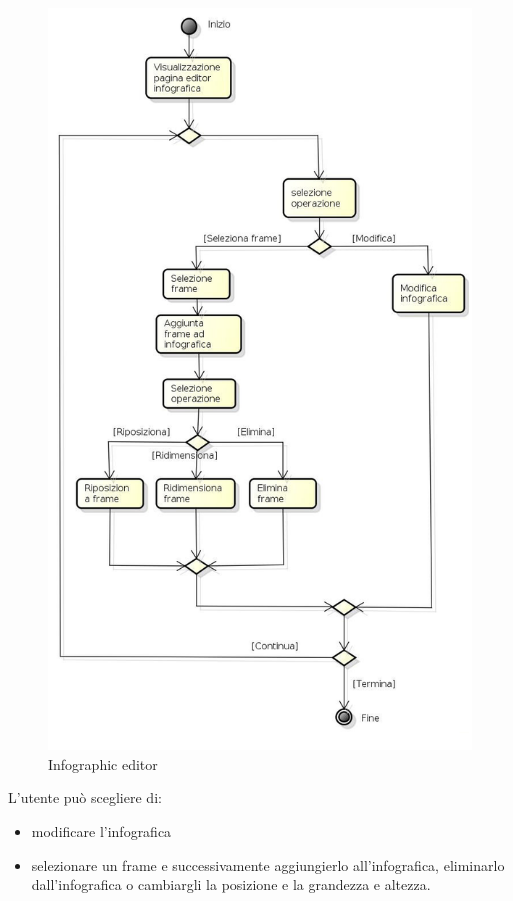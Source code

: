 \begin{figure}[h!]
		\centering
		\includegraphics[scale=.4]{img/Editor_infografica.jpg}
		\caption{Infographic editor}
		\label{fig:Infografica_editor}
\end{figure}

L'utente può scegliere di: 
\begin{itemize}
\item modificare l'infografica 
\item selezionare un frame e successivamente aggiungierlo all'infografica, eliminarlo dall'infografica o cambiargli la posizione e la grandezza e altezza.
\end{itemize}

